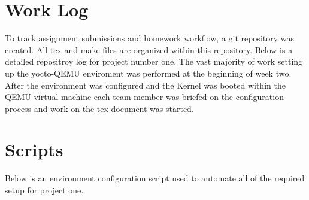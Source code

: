 \documentclass[10pt,onecolumn,draftclsnofoot]{IEEEtran} %
\begin{document}
\begin{singlespace}
\newpage
\section{\bf Work Log}
\normalfont \indent To track assignment submissions and homework workflow, a git repository was created. All tex and make files are organized within this repository. Below is a detailed repositroy log for project number one. The vast majority of work setting up the yocto-QEMU enviroment was performed at the beginning of week two. After the environment was configured and the Kernel was booted within the QEMU virtual machine each team member was briefed on the configuration process and work on the tex document was started. 

        \begin{center}
                
        \end{center}

\newpage
\section{\bf Scripts}
\normalfont \indent Below is an environment configuration script used to automate all of the required setup for project one. 




\end{singlespace}
\restoregeometry
\end{document}
